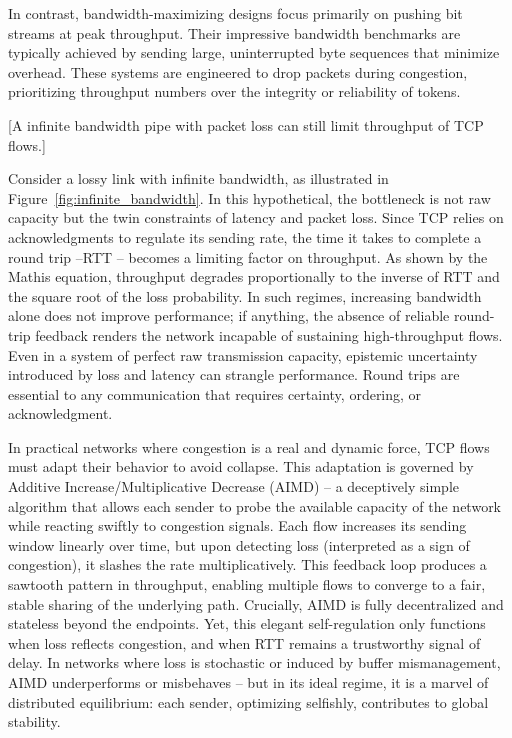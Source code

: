 \documentclass[../../../OAE-SPEC-MAIN.tex]{subfiles}
\begin{document}
In contrast, bandwidth-maximizing designs focus primarily on pushing bit streams at peak throughput. Their impressive bandwidth benchmarks are typically achieved by sending large, uninterrupted byte sequences that minimize overhead. These systems are engineered to drop packets during congestion, prioritizing throughput numbers over the integrity or reliability of tokens.

[A infinite bandwidth pipe with packet loss can still limit throughput of TCP flows.]


Consider a lossy link with infinite bandwidth, as illustrated in Figure~\ref{fig:infinite_bandwidth}. In this hypothetical, the bottleneck is not raw capacity but the twin constraints of latency and packet loss. Since TCP relies on acknowledgments to regulate its sending rate, the time it takes to complete a round trip --RTT -- becomes a limiting factor on throughput. As shown by the Mathis equation\cite{mathis1997}, throughput degrades proportionally to the inverse of RTT and the square root of the loss probability. In such regimes, increasing bandwidth alone does not improve performance; if anything, the absence of reliable round-trip feedback renders the network incapable of sustaining high-throughput flows. Even in a system of perfect raw transmission capacity, epistemic uncertainty introduced by loss and latency can strangle performance. Round trips are essential to any communication that requires certainty, ordering, or acknowledgment.

In practical networks where congestion is a real and dynamic force, TCP flows must adapt their behavior to avoid collapse. This adaptation is governed by Additive Increase/Multiplicative Decrease (AIMD) -- a deceptively simple algorithm that allows each sender to probe the available capacity of the network while reacting swiftly to congestion signals. Each flow increases its sending window linearly over time, but upon detecting loss (interpreted as a sign of congestion), it slashes the rate multiplicatively. This feedback loop produces a sawtooth pattern in throughput, enabling multiple flows to converge to a fair, stable sharing of the underlying path. Crucially, AIMD is fully decentralized and stateless beyond the endpoints. Yet, this elegant self-regulation only functions when loss reflects congestion, and when RTT remains a trustworthy signal of delay. In networks where loss is stochastic or induced by buffer mismanagement, AIMD underperforms or misbehaves \cite{Gettys2012} -- but in its ideal regime, it is a marvel of distributed equilibrium: each sender, optimizing selfishly, contributes to global stability.
\end{document}
